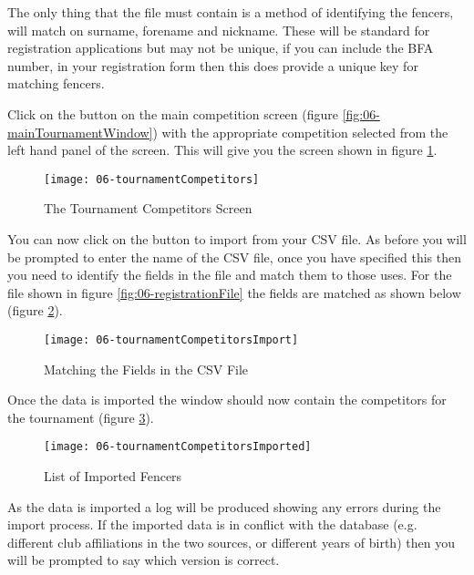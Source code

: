 \documentclass[a4paper,11pt]{memoir}
\begin{document}
The only thing that the file must contain is a method of identifying the fencers, \fencingtime{} will match on surname, forename and nickname. These will be standard for registration applications but may not be unique, if you can include the BFA number, in your registration form then this does provide a unique key for matching fencers. 

Click on the   button on the main competition screen (figure \ref{fig:06-mainTournamentWindow}) with the appropriate competition selected from the left hand panel of the screen. This will give you the screen shown in figure \ref{fig:06-tournamentCompetitors}.

\begin{figure}[!ht]
 \centering
 \texttt{[image: 06-tournamentCompetitors]}
 \caption{The Tournament Competitors Screen} \label{fig:06-tournamentCompetitors}
\end{figure}

You can now click on the  button to import from your CSV file. As before you will be prompted to enter the name of the CSV file, once you have specified this then you need to identify the fields in the file and match them to those \fencingtime{} uses. For the file shown in figure \ref{fig:06-registrationFile} the fields are matched as shown below (figure \ref{fig:06-tournamentCompetitorsImport}).

\begin{figure}[!ht]
 \centering
 \texttt{[image: 06-tournamentCompetitorsImport]}
 \caption{Matching the Fields in the CSV File} \label{fig:06-tournamentCompetitorsImport}
\end{figure}

Once the data is imported the window should now contain the competitors for the tournament (figure \ref{fig:06-tournamentCompetitorsImported}).

\begin{figure}[!ht]
 \centering
 \texttt{[image: 06-tournamentCompetitorsImported]}
 \caption{List of Imported Fencers} \label{fig:06-tournamentCompetitorsImported}
\end{figure}

As the data is imported a log will be produced showing any errors during the import process. If the imported data is in conflict with the database (e.g. different club affiliations in the two sources, or different years of birth) then you will be prompted to say which version is correct.
\end{document}
